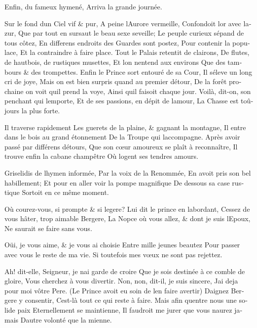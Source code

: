 \documentclass[14pt,a4paper]{memoir}
\begin{document}
\begin{otherlanguage}{french}
{Enfin, du fameux hymené,} {Arriva la grande journée.}

{Sur le fond d\textquotesingle un Ciel vif \& pur,} {A peine
l\textquotesingle Aurore vermeille,} {Confondoit l\textquotesingle or
avec l\textquotesingle azur,} {Que par tout en sursaut le beau sexe
s\textquotesingle eveille; } {Le peuple curieux s\textquotesingle épand
de tous côtez,} {En differens endroits des Guardes sont postez,} {Pour
contenir la populace,} {Et la contraindre à faire place.} {Tout le
Palais retentit de clairons,} {De flutes, de hautbois, de rustiques
musettes,} {Et l\textquotesingle on n\textquotesingle entend aux
environs} {Que des tambours \& des trompettes.} {Enfin le Prince sort
entouré de sa Cour,} {Il s\textquotesingle éleve un long cri de joye,}
{Mais on est bien surpris quand au premier détour, } {De la forêt
prochaine on voit qu\textquotesingle il prend la voye,} {Ainsi
qu\textquotesingle il faisoit chaque jour.} {Voilà, dit-on, son penchant
qui l\textquotesingle emporte,} {Et de ses passions, en dépit de
l\textquotesingle amour,} {La Chasse est toûjours la plus forte.}

{Il traverse rapidement} {Les guerets de la plaine, \& gagnant la
montagne,} {Il entre dans le bois au grand étonnement} {De la Troupe qui
l\textquotesingle accompagne.} {Après avoir passé par différens
détours,} {Que son cœur amoureux se plaît à reconnaître,} {Il trouve
enfin la cabane champêtre} {Où logent ses tendres amours.}

{Griselidis de l\textquotesingle hymen informée,} {Par la voix de la
Renommée,} {En avoit pris son bel habillement;} {Et pour en aller voir
la pompe magnifique} {De dessous sa case rustique} {Sortoit en ce même
moment.}

{Où courez-vous, si prompte \& si legere?} {Lui dit le prince en
l\textquotesingle abordant,} {Cessez de vous hâter, trop aimable
Bergere,} {La Nopce où vous allez, \& dont je suis
l\textquotesingle Epoux,} {Ne saurait se faire sans vous.}

{Oüi, je vous aime, \& je vous ai choisie} {Entre mille jeunes beautez}
{Pour passer avec vous le reste de ma vie.} {Si toutefois mes vœux ne
sont pas rejettez. }

{Ah! dit-elle, Seigneur, je n\textquotesingle ai garde de croire } {Que
je sois destinée à ce comble de gloire,} {Vous cherchez à vous
divertir.} {Non, non, dit-il, je suis sincere,} {J\textquotesingle ai
deja pour moi vôtre Pere.} {(Le Prince avoit eu soin de
l\textquotesingle en faire avertir) } {Daignez Bergere y consentir,}
{C\textquotesingle est-là tout ce qui reste à faire.} {Mais afin
qu\textquotesingle entre nous une solide paix} {Eternellement se
maintienne,} {Il faudroit me jurer que vous n\textquotesingle aurez
jamais} {D\textquotesingle autre volonté que la mienne.}


\end{otherlanguage}
\end{document}

